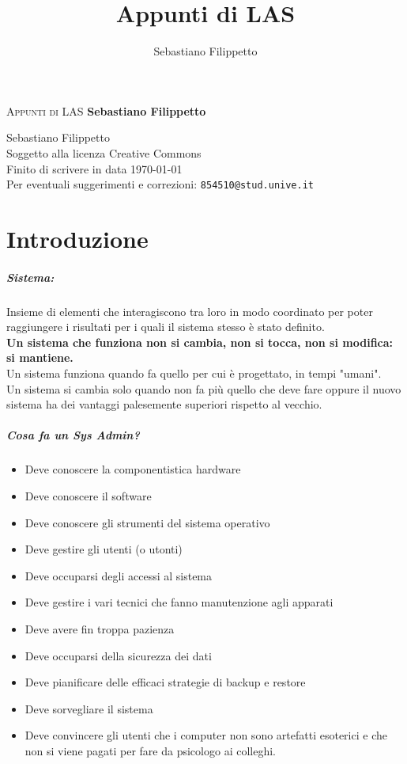\documentclass[a4paper]{report}
\title{\Huge{Appunti di LAS}}
\author{Sebastiano Filippetto}
\begin{document}
\begin{minipage}[c][\textheight][c]{\textwidth}\centering
\textsc{\Huge Appunti di LAS}
\vfill
\textbf{\Large Sebastiano Filippetto}
\vfill
\end{minipage}
\newpage
\begin{minipage}[c][\textheight][c]{\textwidth}
\centering
\textcopyright Sebastiano Filippetto
\\
Soggetto alla licenza Creative Commons\\
Finito di scrivere in data \today \\
Per eventuali suggerimenti e correzioni: \texttt{854510@stud.unive.it}
\end{minipage}

\tableofcontents
\newpage
\chapter{Introduzione}
\paragraph{Sistema:} Insieme di elementi che interagiscono tra loro in modo coordinato per poter raggiungere i risultati per i quali il sistema stesso è stato definito. \\
\textbf{Un sistema che funziona non si cambia, non si tocca, non si modifica: si mantiene.}\\
Un sistema funziona quando fa quello per cui è progettato, in tempi "umani".\\
Un sistema si cambia solo quando non fa più quello che deve fare oppure il nuovo sistema ha dei vantaggi palesemente superiori rispetto al vecchio.\\
\paragraph{Cosa fa un Sys Admin?}
\begin{itemize}
\item Deve conoscere la componentistica hardware
\item Deve conoscere il software
\item Deve conoscere gli strumenti del sistema operativo
\item Deve gestire gli utenti (o utonti)
\item Deve occuparsi degli accessi al sistema
\item Deve gestire i vari tecnici che fanno manutenzione agli apparati
\item Deve avere fin troppa pazienza
\item Deve occuparsi della sicurezza dei dati
\item Deve pianificare delle efficaci strategie di backup e restore
\item Deve sorvegliare il sistema
\item Deve convincere gli utenti che i computer non sono artefatti esoterici e che non si viene pagati per fare da psicologo ai colleghi.
\end{itemize}
\end{document}
